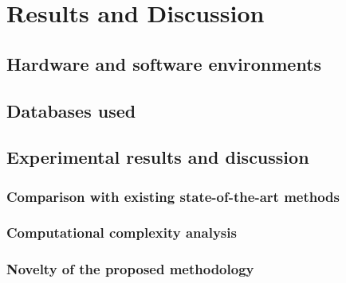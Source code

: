 \chapter{Results and Discussion}
\label{Experimental_results}


\section{Hardware and software environments}


\section{Databases used}  


\section{Experimental results and discussion}

\subsection{Comparison with existing state-of-the-art methods}


\subsection{Computational complexity analysis} 


\subsection{Novelty of the proposed methodology}


